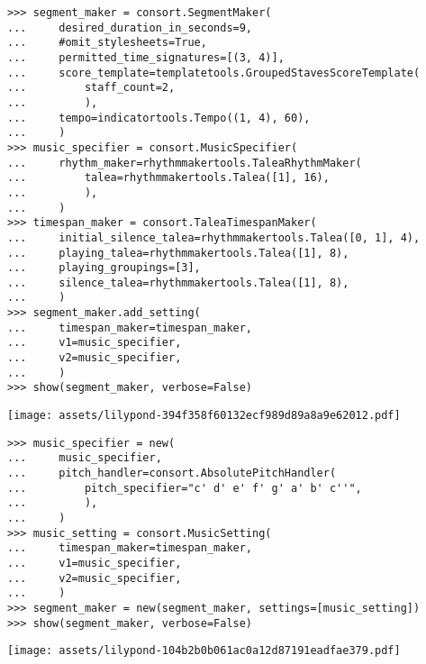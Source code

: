 \begin{abjadbookoutput}
\begin{singlespacing}
\vspace{-0.5\baselineskip}
\begin{lstlisting}
>>> segment_maker = consort.SegmentMaker(
...     desired_duration_in_seconds=9,
...     #omit_stylesheets=True,
...     permitted_time_signatures=[(3, 4)],
...     score_template=templatetools.GroupedStavesScoreTemplate(
...         staff_count=2,
...         ),
...     tempo=indicatortools.Tempo((1, 4), 60),
...     )
>>> music_specifier = consort.MusicSpecifier(
...     rhythm_maker=rhythmmakertools.TaleaRhythmMaker(
...         talea=rhythmmakertools.Talea([1], 16),
...         ),
...     )
>>> timespan_maker = consort.TaleaTimespanMaker(
...     initial_silence_talea=rhythmmakertools.Talea([0, 1], 4),
...     playing_talea=rhythmmakertools.Talea([1], 8),
...     playing_groupings=[3],
...     silence_talea=rhythmmakertools.Talea([1], 8),
...     )
>>> segment_maker.add_setting(
...     timespan_maker=timespan_maker,
...     v1=music_specifier,
...     v2=music_specifier,
...     )
>>> show(segment_maker, verbose=False)
\end{lstlisting}
\noindent\texttt{[image: assets/lilypond-394f358f60132ecf989d89a8a9e62012.pdf]}
\end{singlespacing}
\end{abjadbookoutput}

\begin{comment}
<abjad>[stylesheet=../consort.ily]
music_specifier = new(
    music_specifier,
    pitch_handler=consort.AbsolutePitchHandler(
        pitch_specifier="c' d' e' f' g' a' b' c''",
        ),
    )
music_setting = consort.MusicSetting(
    timespan_maker=timespan_maker,
    v1=music_specifier,
    v2=music_specifier,
    )
segment_maker = new(segment_maker, settings=[music_setting])
show(segment_maker, verbose=False)
</abjad>
\end{comment}

\begin{abjadbookoutput}
\begin{singlespacing}
\vspace{-0.5\baselineskip}
\begin{lstlisting}
>>> music_specifier = new(
...     music_specifier,
...     pitch_handler=consort.AbsolutePitchHandler(
...         pitch_specifier="c' d' e' f' g' a' b' c''",
...         ),
...     )
>>> music_setting = consort.MusicSetting(
...     timespan_maker=timespan_maker,
...     v1=music_specifier,
...     v2=music_specifier,
...     )
>>> segment_maker = new(segment_maker, settings=[music_setting])
>>> show(segment_maker, verbose=False)
\end{lstlisting}
\noindent\texttt{[image: assets/lilypond-104b2b0b061ac0a12d87191eadfae379.pdf]}
\end{singlespacing}
\end{abjadbookoutput}

